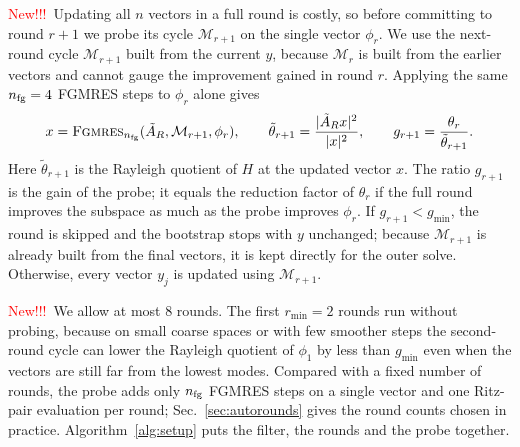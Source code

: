 \documentclass[11pt,a4paper]{article}
\newcounter{alg}
\newif\ifshownew \shownewtrue
\DeclareRobustCommand\New{\ifshownew\textcolor{red}{New!!!}\ \else\ignorespaces\fi}
\numberwithin{equation}{section}
\newcommand{\AR}{\tilde A_{R}}
\newif\ifresults
\begin{document}
\New Updating all $n$ vectors in a full round is costly, so before committing to round $r+1$ we
probe its cycle $\mathcal M_{r+1}$ on the single vector $\phi_r$. We use the next-round cycle
$\mathcal M_{r+1}$ built from the current $y$, because $\mathcal M_r$ is built from the earlier
vectors and cannot gauge the improvement gained in round $r$. Applying the same $n_{\rm fg}=4$
FGMRES steps to $\phi_r$ alone gives
\begin{equation}
x=\textsc{Fgmres}_{n_{\rm fg}}(\AR,\mathcal M_{r+1},\phi_r),\qquad
\tilde\theta_{r+1}=\frac{|\AR x|^2}{|x|^2},\qquad g_{r+1}=\frac{\theta_r}{\tilde\theta_{r+1}}.
\label{eq:probe}
\end{equation}
Here $\tilde\theta_{r+1}$ is the Rayleigh quotient of $H$ at the updated vector $x$. The ratio
$g_{r+1}$ is the gain of the probe; it equals the reduction factor of $\theta_r$ if the full round
improves the subspace as much as the probe improves $\phi_r$. If $g_{r+1}<g_{\min}$, the round is
skipped and the bootstrap stops with $y$ unchanged; because $\mathcal M_{r+1}$ is already built
from the final vectors, it is kept directly for the outer solve. Otherwise, every vector $y_j$ is
updated using $\mathcal M_{r+1}$.

\New We allow at most $8$ rounds. The first $r_{\min}=2$ rounds run without probing, because on
small coarse spaces or with few smoother steps the second-round cycle can lower the Rayleigh
quotient of $\phi_1$ by less than $g_{\min}$ even when the vectors are still far from the lowest
modes\ifresults{} (Sec.~\ref{sec:autorounds})\fi. Compared with a fixed number of rounds, the probe
adds only $n_{\rm fg}$ FGMRES steps on a single vector and one Ritz-pair evaluation per round;
Sec.~\ref{sec:autorounds} gives the round counts chosen in practice. Algorithm~\ref{alg:setup} puts
the filter, the rounds and the probe together.
\end{document}
